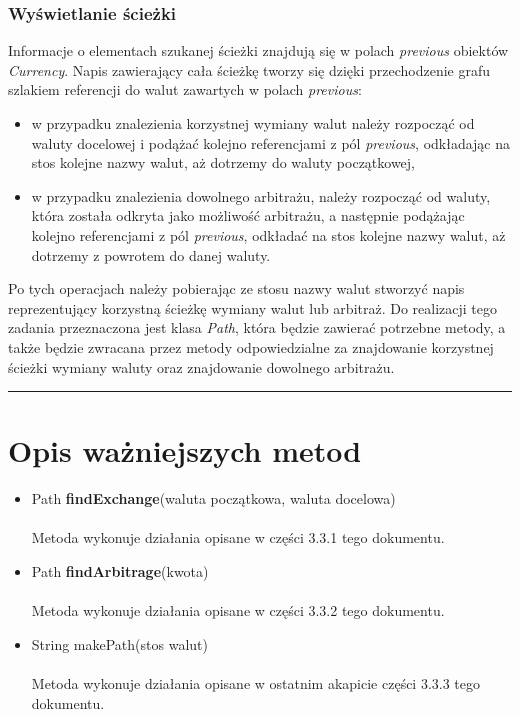 \documentclass[a4paper,11pt]{article}
\newcommand{\linia}{\rule{\linewidth}{0.4mm}}
\begin{document}
\subsubsection{Wyświetlanie ścieżki}
Informacje o elementach szukanej ścieżki znajdują się w polach \textit{previous} obiektów \textit{Currency}.
Napis zawierający cała ścieżkę tworzy się dzięki przechodzenie grafu szlakiem referencji do walut zawartych w polach \textit{previous}:
\begin{itemize}
\item w przypadku znalezienia korzystnej wymiany walut należy rozpocząć od waluty docelowej i podążać kolejno referencjami z pól \textit{previous}, odkładając na stos kolejne nazwy walut, aż dotrzemy do waluty początkowej,
\item w przypadku znalezienia dowolnego arbitrażu, należy rozpocząć od waluty, która została odkryta jako możliwość arbitrażu, a następnie podążając kolejno referencjami z pól \textit{previous}, odkładać na stos kolejne nazwy walut, aż dotrzemy z powrotem do danej waluty.
\end{itemize}

Po tych operacjach należy pobierając ze stosu nazwy walut stworzyć napis reprezentujący korzystną ścieżkę wymiany walut lub arbitraż.
Do realizacji tego zadania przeznaczona jest klasa \textit{Path}, która będzie zawierać potrzebne metody, a także będzie zwracana przez metody odpowiedzialne za znajdowanie korzystnej ścieżki wymiany waluty oraz znajdowanie dowolnego arbitrażu.

\noindent\linia
\section{Opis ważniejszych metod}
\begin{itemize}
\item Path \textbf{findExchange}(waluta początkowa, waluta docelowa)
\\\\
Metoda wykonuje działania opisane w części 3.3.1 tego dokumentu.
\item Path \textbf{findArbitrage}(kwota)
\\\\
Metoda wykonuje działania opisane w części 3.3.2 tego dokumentu.
\item String makePath(stos walut)
\\\\
Metoda wykonuje działania opisane w ostatnim akapicie części 3.3.3 tego dokumentu.
\end{itemize}
\end{document}
